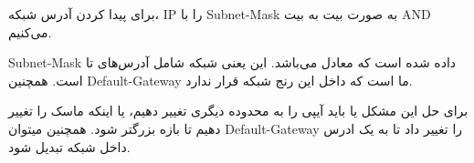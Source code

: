 برای پیدا کردن آدرس شبکه، IP را با Subnet-Mask به صورت بیت به بیت AND می‌کنیم.


Subnet-Mask داده شده  است که معادل  می‌باشد. این یعنی شبکه شامل آدرس‌های  تا  است.
همچنین Default-Gateway ما  است که داخل این رنج شبکه قرار ندارد.

برای حل این مشکل یا باید آیپی را به محدوده دیگری تغییر دهیم، یا اینکه ماسک را تغییر دهیم تا بازه بزرگتر شود. همچنین میتوان Default-Gateway را تغییر داد تا به یک ادرس داخل شبکه تبدیل شود.